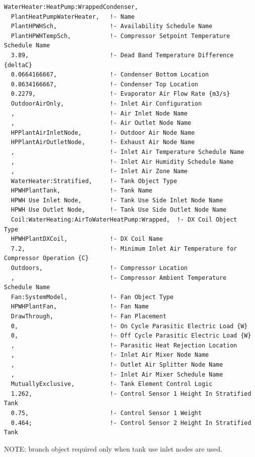 \begin{lstlisting}
WaterHeater:HeatPump:WrappedCondenser,
  PlantHeatPumpWaterHeater,   !- Name
  PlantHPWHSch,               !- Availability Schedule Name
  PlantHPWHTempSch,           !- Compressor Setpoint Temperature Schedule Name
  3.89,                       !- Dead Band Temperature Difference {deltaC}
  0.0664166667,               !- Condenser Bottom Location
  0.8634166667,               !- Condenser Top Location
  0.2279,                     !- Evaporator Air Flow Rate {m3/s}
  OutdoorAirOnly,             !- Inlet Air Configuration
  ,                           !- Air Inlet Node Name
  ,                           !- Air Outlet Node Name
  HPPlantAirInletNode,        !- Outdoor Air Node Name
  HPPlantAirOutletNode,       !- Exhaust Air Node Name
  ,                           !- Inlet Air Temperature Schedule Name
  ,                           !- Inlet Air Humidity Schedule Name
  ,                           !- Inlet Air Zone Name
  WaterHeater:Stratified,     !- Tank Object Type
  HPWHPlantTank,              !- Tank Name
  HPWH Use Inlet Node,        !- Tank Use Side Inlet Node Name
  HPWH Use Outlet Node,       !- Tank Use Side Outlet Node Name
  Coil:WaterHeating:AirToWaterHeatPump:Wrapped,  !- DX Coil Object Type
  HPWHPlantDXCoil,            !- DX Coil Name
  7.2,                        !- Minimum Inlet Air Temperature for Compressor Operation {C}
  Outdoors,                   !- Compressor Location
  ,                           !- Compressor Ambient Temperature Schedule Name
  Fan:SystemModel,            !- Fan Object Type
  HPWHPlantFan,               !- Fan Name
  DrawThrough,                !- Fan Placement
  0,                          !- On Cycle Parasitic Electric Load {W}
  0,                          !- Off Cycle Parasitic Electric Load {W}
  ,                           !- Parasitic Heat Rejection Location
  ,                           !- Inlet Air Mixer Node Name
  ,                           !- Outlet Air Splitter Node Name
  ,                           !- Inlet Air Mixer Schedule Name
  MutuallyExclusive,          !- Tank Element Control Logic
  1.262,                      !- Control Sensor 1 Height In Stratified Tank
  0.75,                       !- Control Sensor 1 Weight
  0.464;                      !- Control Sensor 2 Height In Stratified Tank
\end{lstlisting}

NOTE: branch object required only when tank use inlet nodes are used.


